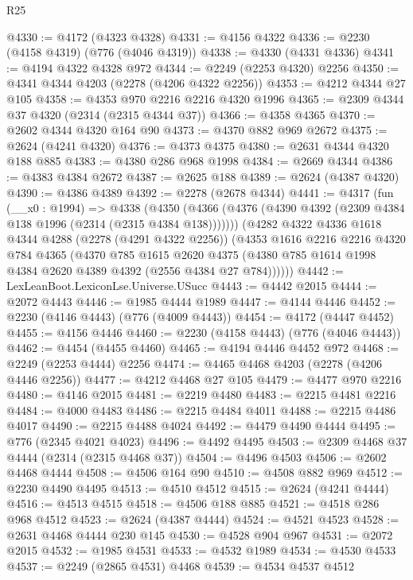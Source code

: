 \begin{lexlean}{R25}
\begin{coremodule}
@4330 := @4172 (@4323 @4328)
@4331 := @4156 @4322
@4336 := @2230 (@4158 @4319) (@776 (@4046 @4319))
@4338 := @4330 (@4331 @4336)
@4341 := @4194 @4322 @4328 @972
@4344 := @2249 (@2253 @4320) @2256
@4350 := @4341 @4344 @4203 (@2278 (@4206 @4322 @2256))
@4353 := @4212 @4344 @27 @105
@4358 := @4353 @970 @2216 @2216 @4320 @1996
@4365 := @2309 @4344 @37 @4320 (@2314 (@2315 @4344 @37))
@4366 := @4358 @4365
@4370 := @2602 @4344 @4320 @164 @90
@4373 := @4370 @882 @969 @2672
@4375 := @2624 (@4241 @4320)
@4376 := @4373 @4375
@4380 := @2631 @4344 @4320 @188 @885
@4383 := @4380 @286 @968 @1998
@4384 := @2669 @4344
@4386 := @4383 @4384 @2672
@4387 := @2625 @188
@4389 := @2624 (@4387 @4320)
@4390 := @4386 @4389
@4392 := @2278 (@2678 @4344)
@4441 := @4317
    (fun (__x0 : @1994) =>
    @4338
      (@4350 (@4366 (@4376 (@4390 @4392 (@2309 @4384 @138 @1996 (@2314 (@2315 @4384 @138)))))))
      (@4282
        @4322
        @4336
        @1618
        @4344
        @4288
        (@2278 (@4291 @4322 @2256))
        (@4353
          @1616
          @2216
          @2216
          @4320
          @784
          @4365
          (@4370
            @785
            @1615
            @2620
            @4375
            (@4380 @785 @1614 @1998 @4384 @2620 @4389 @4392 (@2556 @4384 @27 @784))))))
@4442 := LexLeanBoot.LexiconLse.Universe.USucc
@4443 := @4442 @2015
@4444 := @2072 @4443
@4446 := @1985 @4444 @1989
@4447 := @4144 @4446
@4452 := @2230 (@4146 @4443) (@776 (@4009 @4443))
@4454 := @4172 (@4447 @4452)
@4455 := @4156 @4446
@4460 := @2230 (@4158 @4443) (@776 (@4046 @4443))
@4462 := @4454 (@4455 @4460)
@4465 := @4194 @4446 @4452 @972
@4468 := @2249 (@2253 @4444) @2256
@4474 := @4465 @4468 @4203 (@2278 (@4206 @4446 @2256))
@4477 := @4212 @4468 @27 @105
@4479 := @4477 @970 @2216
@4480 := @4146 @2015
@4481 := @2219 @4480
@4483 := @2215 @4481 @2216
@4484 := @4000 @4483
@4486 := @2215 @4484 @4011
@4488 := @2215 @4486 @4017
@4490 := @2215 @4488 @4024
@4492 := @4479 @4490 @4444
@4495 := @776 (@2345 @4021 @4023)
@4496 := @4492 @4495
@4503 := @2309 @4468 @37 @4444 (@2314 (@2315 @4468 @37))
@4504 := @4496 @4503
@4506 := @2602 @4468 @4444
@4508 := @4506 @164 @90
@4510 := @4508 @882 @969
@4512 := @2230 @4490 @4495
@4513 := @4510 @4512
@4515 := @2624 (@4241 @4444)
@4516 := @4513 @4515
@4518 := @4506 @188 @885
@4521 := @4518 @286 @968 @4512
@4523 := @2624 (@4387 @4444)
@4524 := @4521 @4523
@4528 := @2631 @4468 @4444 @230 @145
@4530 := @4528 @904 @967
@4531 := @2072 @2015
@4532 := @1985 @4531
@4533 := @4532 @1989
@4534 := @4530 @4533
@4537 := @2249 (@2865 @4531) @4468
@4539 := @4534 @4537 @4512

\end{coremodule}
\end{lexlean}
